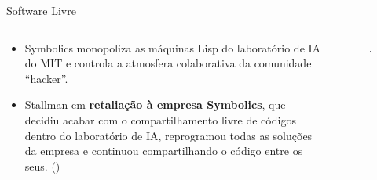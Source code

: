 \documentclass{beamer}
\begin{document}
\begin{frame}{Software Livre}
    \begin{columns}
        \begin{column}{0.7\textwidth}
            \begin{itemize}
                \item Symbolics monopoliza as máquinas Lisp do laboratório de IA do MIT e controla a atmosfera colaborativa da comunidade ``hacker''.
                \item Stallman em \textbf{retaliação à empresa Symbolics}, que decidiu acabar com o compartilhamento livre de códigos dentro do laboratório de IA, reprogramou todas as soluções da empresa e continuou compartilhando o código entre os seus. (\cite{RTC2009})
            \end{itemize} 
        \end{column}
        \begin{column}{0.3\textwidth}
            \begin{figure}
                \centering
                \includegraphics[width=1\linewidth]{img/220px-LISP_machine.jpg}
            \end{figure}
        \end{column}
    \end{columns}
\end{frame}
\end{document}
